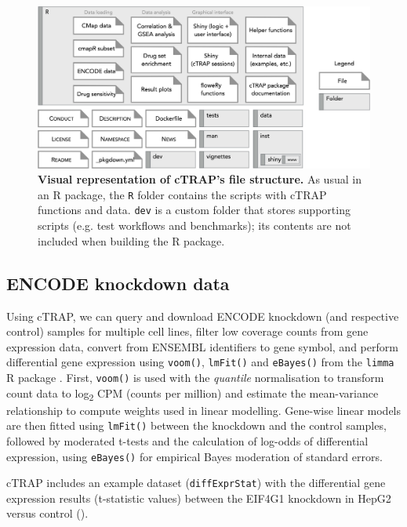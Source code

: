 \begin{figure}[!ht]
  \includegraphics[width=1\textwidth]{images/ctrap/file-structure}
  \centering
  \caption[cTRAP file structure]{\textbf{Visual representation of cTRAP's file structure.} As usual in an R package, the \texttt{R} folder contains the scripts with cTRAP functions and data. \texttt{dev} is a custom folder that stores supporting scripts (e.g. test workflows and benchmarks); its contents are not included when building the R package.}
  \label{fig:ctrap-file-structure}
\end{figure}

\subsection{ENCODE knockdown data}

Using cTRAP, we can query and download ENCODE knockdown (and respective control) samples for multiple cell lines, filter low coverage counts from gene expression data, convert from ENSEMBL identifiers to gene symbol, and perform differential gene expression using \texttt{voom()}, \texttt{lmFit()} and \texttt{eBayes()} from the \texttt{limma} R package \cite{ritchie:2015tm}. First, \texttt{voom()} is used with the \emph{quantile} normalisation to transform count data to log\textsubscript{2} CPM (counts per million) and estimate the mean-variance relationship to compute weights used in linear modelling. Gene-wise linear models are then fitted using \texttt{lmFit()} between the knockdown and the control samples, followed by moderated t-tests and the calculation of log-odds of differential expression, using \texttt{eBayes()} for empirical Bayes moderation of standard errors.

cTRAP includes an example dataset (\texttt{diffExprStat}) with the differential gene expression results (t-statistic values) between the EIF4G1 knockdown in HepG2 versus control ().


